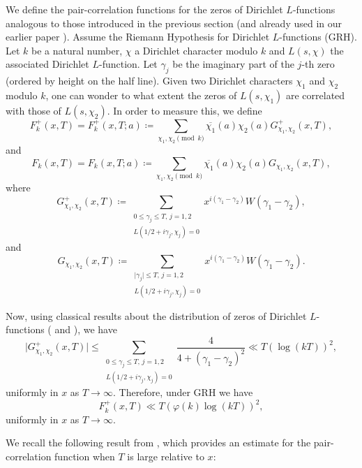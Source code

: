 \documentclass[pdflatex]{sn-jnl}%
\theoremstyle{sltheorems}
\theoremstyle{plainrem}
\theoremstyle{definition}
\begin{document}
We define the pair-correlation functions for the zeros 
of Dirichlet $L$-functions analogous to those introduced in the previous section (and already used in our
earlier paper \cite{mathannalen}).
Assume the 
Riemann Hypothesis for Dirichlet $L$-functions (GRH).
Let $k$ be a natural number,
$\chi$ a Dirichlet character modulo $k$ and $L(s, \chi)$  the associated Dirichlet $L$-function. 
Let $\gamma_j$ be the imaginary part of the $j$-th zero (ordered by height on the half line).
Given two Dirichlet characters $\chi_1$ and $\chi_2$ modulo $k$, one can wonder to what 
extent the zeros of $L(s,\chi_1)$ are correlated with those of $L(s,\chi_2)$.
In order to measure this, we define
\begin{equation*}
F^{+}_{k}(x,T) 
=
F^{+}_k(x,T;a)
\coloneq
\sum_{\chi_1,\chi_2 \pmod{k}} \overline{\chi_1}(a) \chi_2(a)G^{+}_{\chi_1, \chi_2} (x,T),
\end{equation*}
and
\begin{equation*}
F_{k}(x,T) 
=
F_k(x,T;a)
\coloneq
\sum_{\chi_1,\chi_2 \pmod{k}} \overline{\chi_1}(a) \chi_2(a)G_{\chi_1, \chi_2} (x,T),
\end{equation*}
where
\[
G^{+}_{\chi_1,\chi_2}(x,T) 
\coloneq
\sum_{\substack{ 0 \le \gamma_j \le T, \, j = 1,2 \\ L(1/2+ i\gamma_j, \chi_j) = 0}} 
x^{i(\gamma_1 - \gamma_2)} W(\gamma_1 - \gamma_2),
\]
and
\[
G_{\chi_1,\chi_2}(x,T) 
\coloneq
\sum_{\substack{ \vert \gamma_j \vert \le T, \, j = 1,2 \\ L(1/2+ i\gamma_j, \chi_j) = 0}} 
x^{i(\gamma_1 - \gamma_2)} W(\gamma_1 - \gamma_2).
\]

Now, using classical results about the 
distribution of zeros of Dirichlet $L$-functions (\cite[Ch.~16, eq.~(1)]{Davenport} 
and  \cite[Ch.~16, Lemma]{Davenport}), 
we have 
\begin{equation*}
    \vert G^+_{\chi_1, \chi_2}(x,T) \vert  
   \le
   \sum_{\substack{0 \le  \gamma_j  \le T, \, j = 1, 2 \\ L(1/2+ i\gamma_j, \chi_j) = 0
   }}
\frac{4}{4 + (\gamma_1 - \gamma_2)^2}
\ll 
T (\log(kT))^2,
\end{equation*}
uniformly in $x$ as $T \to \infty$.
Therefore, under GRH we  have
%
\begin{equation*}
  F^{+}_{k}(x,T)
\ll T (\varphi(k) \log (kT))^2,
\end{equation*}
%
uniformly in $x$ as $T \to \infty$.

We recall the following result from \cite{mathannalen}, which provides an estimate for the pair-correlation function when $T$ is large relative to $x$:
\end{document}
